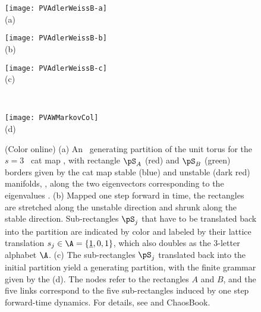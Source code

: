 \begin{figure}\begin{center}
            \begin{minipage}[c]{0.23\textwidth}\begin{center}
\texttt{[image: PVAdlerWeissB-a]}\\(a)
            \end{center}\end{minipage}
            \begin{minipage}[c]{0.23\textwidth}\begin{center}
\texttt{[image: PVAdlerWeissB-b]}\\(b)
            \end{center}\end{minipage}
            \begin{minipage}[c]{0.23\textwidth}\begin{center}
\texttt{[image: PVAdlerWeissB-c]}\\(c)
            \end{center}\end{minipage}
            ~~~
            \begin{minipage}[c]{0.12\textwidth}\begin{center}
\texttt{[image: PVAWMarkovCol]}\\(d)
            \end{center}\end{minipage}
\end{center}
  \caption{\label{fig:PVAdlerWeissB}
(Color online)
(a)
An \AW\ generating partition of the unit torus for the $s=3$ \PV\ cat map
, with rectangle $\pS_A$ (red) and $\pS_B$
(green) borders given by the cat map stable (blue) and unstable (dark
red) manifolds, \ie, along the two eigenvectors corresponding to the
eigenvalues .
(b)
Mapped one step forward in time, the rectangles are stretched along the
unstable direction and shrunk along the stable direction. Sub-rectangles
$\pS_j$ that have to be translated back into the partition are indicated by
color and labeled by their lattice translation
$\Ssym{j}\in\A=\{\underline{1},0,1\}$, which also doubles as the 3-letter
alphabet $\A$.
(c)
The sub-rectangles $\pS_j$ translated back into the initial partition
yield a generating partition, with the finite grammar given by the
{\markGraph}
(d).
The nodes
refer to the rectangles $A$ and $B$, and the five links correspond to the five
sub-rectangles induced by one step forward-time dynamics.
For details, see  and ChaosBook.
}
\end{figure}

